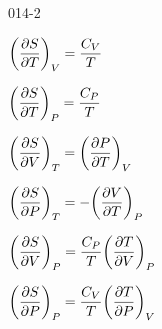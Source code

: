 \begin{mitframe}{014-2} %

    
\begin{listone}
        
    \item $\bigg(\dfrac{\partial\entropy}{\partial\Temp}\bigg)_{\vol}=\dfrac{\cv}{\Temp}$
        
    \item$\bigg(\dfrac{\partial\entropy}{\partial\Temp}\bigg)_{\p} = \dfrac{\cp}{\Temp}$
    
    \item $\bigg(\dfrac{\partial\entropy}{\partial\vol}\bigg)_{\Temp} =\bigg(\dfrac{\partial\p}{\partial\Temp}\bigg)_{\vol}$        
   
    \item$\bigg(\dfrac{\partial\entropy}{\partial\p}\bigg)_{\Temp} = -\bigg(\dfrac{\partial\vol}{\partial\Temp}\bigg)_{\p}$
        
    \item $\bigg(\dfrac{\partial\entropy}{\partial\vol}\bigg)_{\p} =\dfrac{\cp}{\Temp}\bigg(\dfrac{\partial\Temp}{\partial\vol}\bigg)_{\p}$
    
    \item$\bigg(\dfrac{\partial\entropy}{\partial\p}\bigg)_{\p} = \dfrac{\cv}{\Temp}\bigg(\dfrac{\partial\Temp}{\partial\p}\bigg)_{\vol}$
    
\end{listone}			

\end{mitframe}